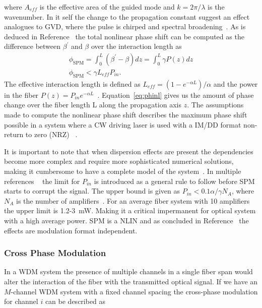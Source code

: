 where $A_{eff}$ is the effective area of the guided mode and $k=2\pi/\lambda$ is the wavenumber. In it self the change to the propagation constant suggest an effect analogues to GVD, where the pulse is chirped and spectral broadening~\cite{agrawal2000nonlinear}. As is deduced in Reference~\cite{le2015advanced} the total nonlinear phase shift can be computed as the difference between $\beta^\prime$ and $\beta$ over the interaction length as  
\begin{subequations}
\begin{gather}
\phi_{\text{SPM}}=\int_0^L(\beta^\prime-\beta)dz=\int_0^L\gamma P(z)dz\\
\phi_{\text{SPM}}<\gamma L_{eff}P_{in}.
\end{gather}
\label{eq:phinl}
\end{subequations}
The effective interaction length is defined as $L_{eff}=(1-e^{-\alpha L})/\alpha$ and the power in the fiber $P(z)=P_{in}e^{-\alpha L}$~\cite{le2015advanced}. Equation~\ref{eq:phinl} gives us the amount of phase change over the fiber length L along the propagation axis $z$. The assumptions made to compute the nonlinear phase shift describes the maximum phase shift possible in a system where a CW driving laser is used with a IM/DD format non-return to zero (NRZ) ~\cite{agrawal2001applications,FiberAgrawal,le2015advanced}. 

It is important to note that when dispersion effects are present the dependencies become more complex and require more sophisticated numerical solutions, making it cumbersome to have a complete model of the system~\cite{agrawal2001applications,gordon1990phase}.  In multiple references ~\cite{le2015advanced,FiberAgrawal,agrawal2000nonlinear} the limit for $P_{in}$ is introduced as a general rule to follow before SPM starts to corrupt the signal.  The upper bound  is given as $P_{in}<0.1\alpha/\gamma N_{A}$, where $N_{A}$ is the number of amplifiers~\cite{le2015advanced}. For  an average fiber system with 10 amplifiers the upper limit is 1.2-3~mW. Making it a critical impermanent for optical system with a high average power. SPM is a NLIN and as concluded in Reference~\cite{dris2017analysis} the effects are modulation format independent.



\subsubsection{Cross Phase Modulation}
In a WDM system the presence of multiple channels in a single fiber span would alter the interaction of the fiber with the transmitted optical signal.  If we have an $M$-channel WDM system with a fixed channel spacing the cross-phase modulation for channel $i$ can be described as
 
